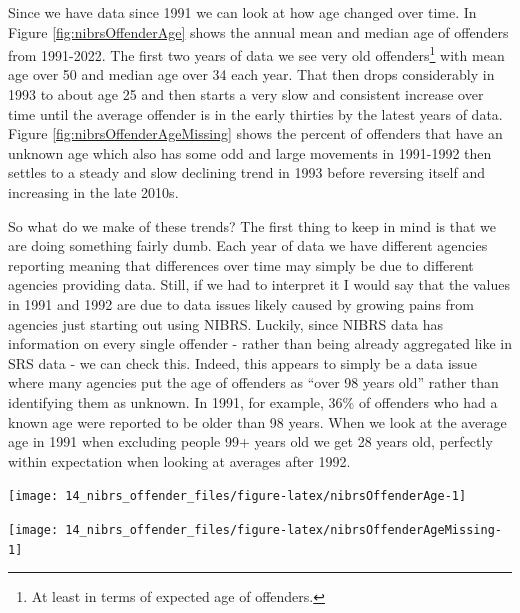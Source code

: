 \documentclass[
]{krantz}
\let\origfigure\figure
\let\endorigfigure\endfigure
\renewenvironment{figure}[1][2] {
    \expandafter\origfigure\expandafter[H]
} {
    \endorigfigure
}
\begin{document}
Since we have data since 1991 we can look at how age changed
over time. In Figure \ref{fig:nibrsOffenderAge} shows the
annual mean and median age of offenders from 1991-2022. The
first two years of data we see very old offenders\footnote{At
  least in terms of expected age of offenders.} with mean
age over 50 and median age over 34 each year. That then
drops considerably in 1993 to about age 25 and then starts a
very slow and consistent increase over time until the
average offender is in the early thirties by the latest
years of data. Figure \ref{fig:nibrsOffenderAgeMissing}
shows the percent of offenders that have an unknown age
which also has some odd and large movements in 1991-1992
then settles to a steady and slow declining trend in 1993
before reversing itself and increasing in the late 2010s.

So what do we make of these trends? The first thing to keep
in mind is that we are doing something fairly dumb. Each
year of data we have different agencies reporting meaning
that differences over time may simply be due to different
agencies providing data. Still, if we had to interpret it I
would say that the values in 1991 and 1992 are due to data
issues likely caused by growing pains from agencies just
starting out using NIBRS. Luckily, since NIBRS data has
information on every single offender - rather than being
already aggregated like in SRS data - we can check this.
Indeed, this appears to simply be a data issue where many
agencies put the age of offenders as ``over 98 years old''
rather than identifying them as unknown. In 1991, for
example, 36\% of offenders who had a known age were reported
to be older than 98 years. When we look at the average age
in 1991 when excluding people 99+ years old we get 28 years
old, perfectly within expectation when looking at averages
after 1992.

\begin{figure}

{\centering \texttt{[image: 14\_nibrs\_offender\_files/figure-latex/nibrsOffenderAge-1]} 

}

\caption{The mean and median age of offenders, 1991-2022.}\label{fig:nibrsOffenderAge}
\end{figure}

\begin{figure}

{\centering \texttt{[image: 14\_nibrs\_offender\_files/figure-latex/nibrsOffenderAgeMissing-1]} 

}

\caption{The percent of offender's age that is unknown, 1991-2022.}\label{fig:nibrsOffenderAgeMissing}
\end{figure}
\end{document}
